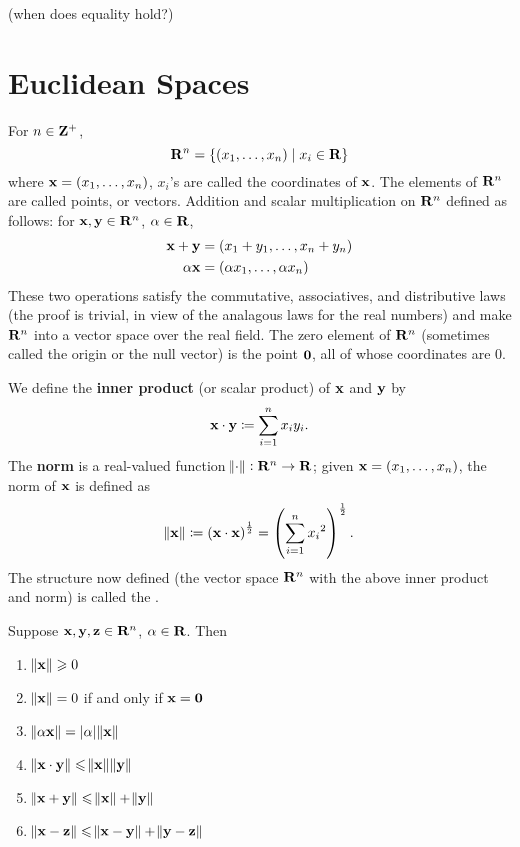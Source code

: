 (when does equality hold?)

\section{Euclidean Spaces}
For $n\in\mathbf Z^+$, 
\[\mathbf R^n=\{(x_1,\dots,x_n)\mid x_i\in\mathbf R\}\]
where $\vb{x}=(x_1,\dots,x_n)$, $x_i$'s are called the coordinates of $\vb{x}$. The elements of $\mathbf R^n$ are called points, or vectors. Addition and scalar multiplication on $\mathbf R^n$ defined as follows: for $\vb{x},\vb{y}\in\mathbf R^n$, $\alpha\in\mathbf R$,
\begin{align*}
\vb{x}+\vb{y}&=(x_1+y_1,\dots,x_n+y_n)\\
\alpha\vb{x}&=(\alpha x_1,\dots,\alpha x_n)
\end{align*}
These two operations satisfy the commutative, associatives, and distributive laws (the proof is trivial, in view of the analagous laws for the real numbers) and make $\mathbf R^n$ into a vector space over the real field. The zero element of $\mathbf R^n$ (sometimes called the origin or the null vector) is the point $\vb{0}$, all of whose coordinates are $0$.

We define the \textbf{inner product} (or scalar product) of $\vb{x}$ and $\vb{y}$ by
\[\vb{x}\cdot\vb{y}\coloneqq\sum_{i=1}^nx_iy_i.\]
The \textbf{norm} is a real-valued function $\norm{\cdot}:\mathbf R^n\to\mathbf R$; given $\vb{x}=(x_1,\dots,x_n)$, the norm of $\vb{x}$ is defined as
\[\norm{\vb{x}}\coloneqq\left(\vb{x}\cdot\vb{x}\right)^\frac{1}{2}=\left(\sum_{i=1}^n{x_i}^2\right)^\frac{1}{2}.\]
The structure now defined (the vector space $\mathbf R^n$ with the above inner product and norm) is called the .

\begin{proposition}
Suppose $\vb{x},\vb{y},\vb{z}\in\mathbf R^n$, $\alpha\in\mathbf R$. Then
\begin{enumerate}[label=(\arabic*)]
\item $\norm{\vb{x}}\geqslant0$
\item $\norm{\vb{x}}=0$ if and only if $\vb{x}=\vb{0}$
\item $\norm{\alpha\vb{x}}=|\alpha|\norm{\vb{x}}$
\item $\norm{\vb{x}\cdot\vb{y}}\leqslant\norm{\vb{x}}\norm{\vb{y}}$
\item $\norm{\vb{x}+\vb{y}}\leqslant\norm{\vb{x}}+\norm{\vb{y}}$
\item $\norm{\vb{x}-\vb{z}}\leqslant\norm{\vb{x}-\vb{y}}+\norm{\vb{y}-\vb{z}}$
\end{enumerate}
\end{proposition}

